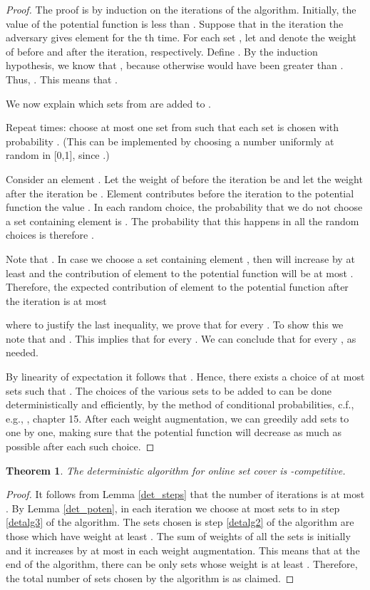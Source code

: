 \documentclass{sig-alternate}
\newtheorem{theorem}{Theorem}\newtheorem{prop}[theorem]{Proposition}
\begin{document}
\begin{proof}
The proof is by induction on the iterations of the algorithm.
Initially, the value of the potential function  is less than
. Suppose that in the iteration the adversary
gives element  for the th time. For each set ,
let  and  denote the weight of  before and
after the iteration, respectively. Define . By the induction hypothesis, we know that , because otherwise  would have been
greater than . Thus, . This means that .

We now explain which sets from  are added to .

Repeat  times: choose at most one set from  such
that each set  is chosen with probability
. (This can be implemented by choosing a number
uniformly at random in [0,1], since .)

Consider an element . Let the weight of  before the
iteration be  and let the weight after the iteration be
. Element  contributes before the
iteration to the potential function the value . In
each random choice, the probability that we do not choose a set
containing element  is . The probability
that this happens in all the  random choices is
therefore .

Note that . In case we choose a set
containing element , then  will increase by at
least  and the contribution of element  to the potential
function will be at most . Therefore, the expected contribution of element
 to the potential function after the iteration is at most



where to justify the last inequality, we prove that  for every . To show this we
note that  and . This
implies that  for every . We can conclude
that  for every , as needed.

By linearity of expectation it follows that . Hence, there exists a choice of at most 
sets such that . The choices of the various
sets  to be added to  can be done deterministically and
efficiently, by the method of conditional probabilities, c.f.,
e.g., \cite{AS00}, chapter 15. After each weight augmentation, we
can greedily add sets to  one by one, making sure that the
potential function will decrease as much as possible after each
such choice.
\end{proof}

\begin{theorem}\label{det_comp}
The deterministic algorithm for online set cover is -competitive.
\end{theorem}

\begin{proof}
It follows from Lemma \ref{det_steps} that the number of
iterations is at most . By Lemma
\ref{det_poten}, in each iteration we choose at most 
sets to  in step \ref{detalg3} of the algorithm. The sets
chosen is step \ref{detalg2} of the algorithm are those which have
weight at least . The sum of weights of all the sets is
initially  and it increases by at most  in each weight
augmentation. This means that at the end of the algorithm, there
can be only  sets whose weight is at least .
Therefore, the total number of sets chosen by the algorithm is as
claimed.
\end{proof}
\end{document}
